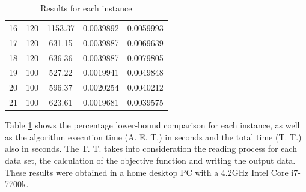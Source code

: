 \documentclass[10pt,twoside]{article}
\begin{document}
\begin{table}[H]
\begin{tabular}{ccccc}
16                & 120            & 1153.37                     & 0.0039892             & 0.0059993          \\
17                & 120            & 631.15                      & 0.0039887             & 0.0069639          \\
18                & 120            & 636.36                      & 0.0039887             & 0.0079805          \\
19                & 100            & 527.22                      & 0.0019941             & 0.0049848          \\
20                & 100            & 596.37                      & 0.0020254             & 0.0040212          \\
21                & 100            & 623.61                      & 0.0019681             & 0.0039575          \\ \hline
\end{tabular}
\caption{Results for each instance}
\label{tab:results}
\end{table}

Table \ref{tab:results} shows the percentage lower-bound comparison for each instance, as well as the algorithm execution time (A. E. T.) in seconds and the total time (T. T.) also in seconds. The T. T. takes into consideration the reading process for each data set, the calculation of the objective function and writing the output data. These results were obtained in a home desktop PC with a 4.2GHz Intel Core i7-7700k.
\end{document}
